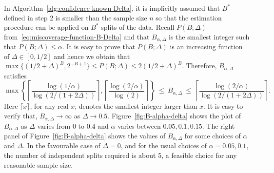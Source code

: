 \documentclass{article}
\numberwithin{myalgctr}{section}
\begin{document}
In Algorithm~\ref{alg:confidence-known-Delta}, it is implicitly assumed that $B^*$ defined in step 2 is smaller than the sample size $n$ so that the estimation procedure can be applied on $B^*$ splits of the data. Recall $P(B; \Delta)$ from~\eqref{eq:miscoverage-function-B-Delta} and that $B_{\alpha,\Delta}$ is the smallest integer such that $P(B; \Delta) \le \alpha.$ It is easy to prove that $P(B; \Delta)$ is an increasing function of $\Delta\in[0, 1/2]$ and hence we obtain that 
$\max\{(1/2 + \Delta)^{B},2^{-B + 1} \}\le P(B; \Delta) \le 2(1/2 + \Delta)^{B}$.
Therefore, $B_{\alpha,\Delta}$ satisfies
\begin{equation}\label{eq:inequalities-B-alpha-Delta}
\max\left\{\left\lceil\frac{\log(1/\alpha)}{\log(2/(1 + 2\Delta))}\right\rceil, \left\lceil\frac{\log(2/\alpha)}{\log(2)}\right\rceil \right\}~\le~ B_{\alpha,\Delta} ~\le~ \left\lceil\frac{\log(2/\alpha)}{\log(2/(1 + 2\Delta))}\right\rceil.
\end{equation}
Here $\lceil x\rceil$, for any real $x$, denotes the smallest integer larger than $x$.
It is easy to verify that,
$B_{\alpha,\Delta}\to\infty$ as $\Delta\to0.5$. 
Figure~\ref{fig:B-alpha-delta} shows the plot of $B_{\alpha,\Delta}$ as $\Delta$ varies from $0$ to $0.4$ and $\alpha$ varies between $0.05, 0.1, 0.15$. {\color{black}The right panel of Figure~\ref{fig:B-alpha-delta} shows the values of $B_{\alpha,\Delta}$ for some choices of $\alpha$ and $\Delta$. In the favourable case of $\Delta = 0$, and for the usual choices of $\alpha = 0.05, 0.1$, the number of independent splits required is about 5, a feasible choice for any reasonable sample size.}
\end{document}
